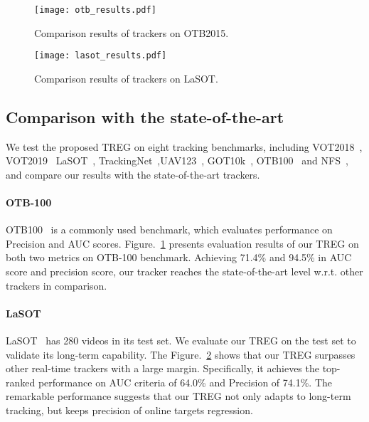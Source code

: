 \documentclass[10pt,twocolumn,letterpaper]{article}
\begin{document}
\begin{figure}[t]
\centering
\texttt{[image: otb\_results.pdf]}
\caption{Comparison results of trackers on OTB2015.
}
\label{fig:otb}
\vspace{-0.4cm}
\end{figure}



\begin{figure}[t]
\centering
\texttt{[image: lasot\_results.pdf]}
\caption{Comparison results of trackers on LaSOT.}
\label{fig:lasot}
\vspace{-0.5cm}
\end{figure}



\subsection{Comparison with the state-of-the-art}
We test the proposed TREG on eight tracking benchmarks, including VOT2018~\cite{vot2018}, VOT2019~\cite{vot2019} LaSOT~\cite{lasot}, TrackingNet~\cite{trackingnet},UAV123~\cite{uav123}, GOT10k~\cite{got10k}, OTB100~\cite{otb} and NFS~\cite{nfs}, and compare our results with the state-of-the-art trackers.

\paragraph{OTB-100}
OTB100~\cite{otb} is a commonly used benchmark, which evaluates performance on Precision and AUC scores. Figure.~\ref{fig:otb} presents evaluation results of our TREG on both two metrics on OTB-100 benchmark. Achieving 71.4\% and 94.5\% in AUC score and precision score, our tracker reaches the state-of-the-art level w.r.t. other trackers in comparison.


\paragraph{LaSOT}

LaSOT~\cite{lasot} has 280 videos in its test set. We evaluate our TREG on the test set to validate its long-term capability. 
The Figure.~\ref{fig:lasot} shows that our TREG surpasses other real-time trackers with a large margin. Specifically, it achieves the top-ranked performance on AUC criteria of 64.0\% and Precision of 74.1\%. The remarkable performance suggests that our TREG not only adapts to long-term tracking, but keeps precision of online targets regression.
\end{document}
